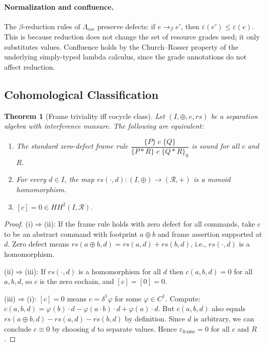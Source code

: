 \documentclass[acmsmall,sigplan,anonymous,review,screen]{acmart}
\newcommand{\inferrule}[2]{%
  \dfrac{\displaystyle #1}{\displaystyle #2}%
}
\theoremstyle{plain}
\newtheorem{theorem}{Theorem}[section]
\theoremstyle{definition}
\newcommand{\rs}{\mathit{rs}}
\newcommand{\sep}{*}
\newcommand{\HH}[2]{H\!H^{#1}(#2)}
\newcommand{\defect}{\varepsilon}
\begin{document}
\paragraph{Normalization and confluence.}
The $\beta$-reduction rules of $\Lambda_{\mathrm{coc}}$ preserve defects:
if $e \to_\beta e'$, then $\defect(e') \leq \defect(e)$.  This is because
reduction does not change the set of resource grades used; it only
substitutes values.  Confluence holds by the Church--Rosser property
of the underlying simply-typed lambda calculus, since the grade annotations
do not affect reduction.

\subsection{Cohomological Classification}
\label{sec:qsl:cohom}

\begin{theorem}[Frame triviality iff cocycle class]
\label{thm:triviality}
  Let $(I, \oplus, e, \rs)$ be a separation algebra with interference
  measure.  The following are equivalent:
  \begin{enumerate}[label=(\roman*),itemsep=2pt]
    \item The standard zero-defect frame rule
      $\inferrule{\{P\}\;c\;\{Q\}}{\{P \sep R\}\;c\;\{Q \sep R\}_0}$
      is sound for all $c$ and $R$.
    \item For every $d \in I$, the map $\rs(\cdot, d) : (I, \oplus) \to
      (\mathcal{R}, +)$ is a monoid homomorphism.
    \item $[c] = 0 \in \HH{2}{I, \mathcal{R}}$.
  \end{enumerate}
\end{theorem}

\begin{proof}
  (i)$\Rightarrow$(ii): If the frame rule holds with zero defect for
  all commands, take $c$ to be an abstract command with footprint $a \oplus b$
  and frame assertion supported at $d$.  Zero defect means $\rs(a \oplus b, d)
  = \rs(a, d) + \rs(b, d)$, i.e., $\rs(\cdot, d)$ is a homomorphism.

  (ii)$\Rightarrow$(iii): If $\rs(\cdot, d)$ is a homomorphism for all $d$
  then $c(a, b, d) = 0$ for all $a, b, d$, so $c$ is the zero cochain,
  and $[c] = [0] = 0$.

  (iii)$\Rightarrow$(i): $[c] = 0$ means $c = \delta^1 \varphi$ for some
  $\varphi \in C^1$.  Compute: $c(a, b, d) = \varphi(b) \cdot d -
  \varphi(a \cdot b) \cdot d + \varphi(a) \cdot d$.  But $c(a,b,d)$ also
  equals $\rs(a \oplus b, d) - \rs(a,d) - \rs(b,d)$ by definition.  Since
  $d$ is arbitrary, we can conclude $c \equiv 0$ by choosing $d$ to
  separate values.  Hence $\defect_{\mathrm{frame}} = 0$ for all $c$ and $R$.
\end{proof}
\end{document}

